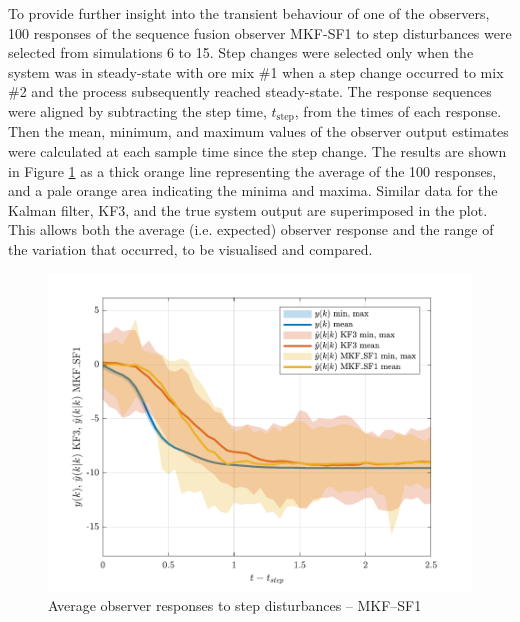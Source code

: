 To provide further insight into the transient behaviour of one of the observers, 100 responses of the sequence fusion observer MKF-SF1 to step disturbances were selected from simulations 6 to 15. Step changes were selected only when the system was in steady-state with ore mix \#1 when a step change occurred to mix \#2 and the process subsequently reached steady-state. The response sequences were aligned by subtracting the step time, $t_\text{step}$, from the times of each response. Then the mean, minimum, and maximum values of the observer output estimates were calculated at each sample time since the step change. The results are shown in Figure \ref{fig:sim_resp_plot_MKF_SF1} as a thick orange line representing the average of the 100 responses, and a pale orange area indicating the minima and maxima. Similar data for the Kalman filter, KF3, and the true system output are superimposed in the plot. This allows both the average (i.e. expected) observer response and the range of the variation that occurred, to be visualised and compared.
\begin{figure}[htp]
	\centering
	\includegraphics[width=13cm]{images/grind1_rod_obs_sim_resp_plot1_MKF_SF1.pdf}
	\caption{Average observer responses to step disturbances -- MKF--SF1}
	\label{fig:sim_resp_plot_MKF_SF1}
\end{figure}
